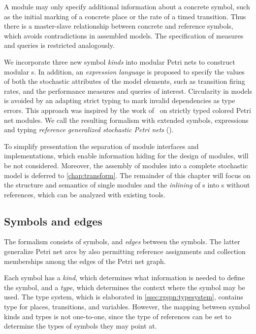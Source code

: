 A module may only specify additional information about a concrete symbol, such as the initial marking of a concrete place or the rate of a timed transition. Thus there is a master-slave relationship between concrete and reference symbols, which avoids contradictions in assembled models. The specification of measures and queries is restricted analogously.

We incorporate three new symbol \emph{kinds} into modular Petri nets to construct modular s. In addition, an \emph{expression language} is proposed to specify the values of both the stochastic attributes of the model elements, such as transition firing rates, and the performance measures and queries of interest. Circularity in models is avoided by an adapting strict typing to mark invalid dependencies as type errors. This approach was inspired by the work of~\citet{Kindler07modular} on strictly typed colored Petri net modules. We call the resulting formalism with extended symbols, expressions and typing \emph{reference generalized stochastic Petri nets} ().

To simplify presentation the separation of module interfaces and implementations, which enable information hiding for the design of modules, will be not considered. Moreover, the assembly of modules into a complete stochastic model is deferred to \cref{chap:transform}. The remainder of this chapter will focus on the structure and semantics of single  modules and the \emph{inlining} of s into s without references, which can be analyzed with existing tools. 

\subsection{Symbols and edges}

The  formalism consists of symbols, and \emph{edges} between the symbols. The latter generalize Petri net arcs by also permitting reference assignments and collection memberships among the edges of the Petri net graph.

Each symbol has a \emph{kind},  which determines what information is needed to define the symbol, and a \emph{type}, which determines the context where the symbol may be used. The type system, which is elaborated in \vref{ssec:rgspn:typesystem}, contains type for places, transitions, and variables. However, the mapping between symbol kinds and types is not one-to-one, since the type of references can be set to determine the types of symbols they may point at.

